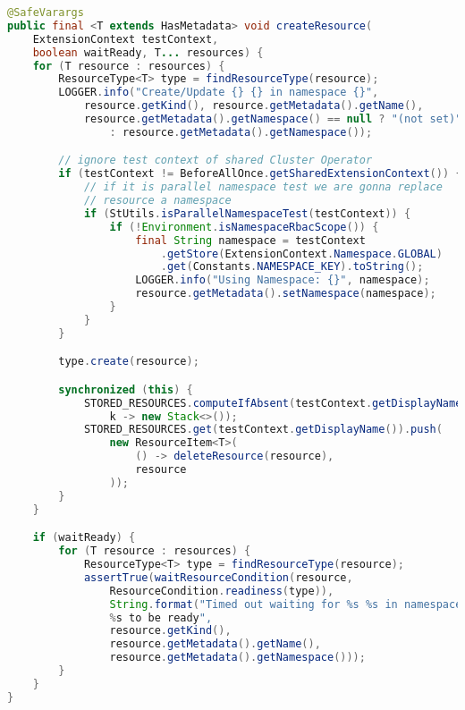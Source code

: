 \begin{lstlisting}[language=Java,label=resourcemanager:complete:create:method,caption=Complete thead-safe method for parallel creation resources,frame=tb]
@SafeVarargs
public final <T extends HasMetadata> void createResource(
    ExtensionContext testContext,
    boolean waitReady, T... resources) {
    for (T resource : resources) {
        ResourceType<T> type = findResourceType(resource);
        LOGGER.info("Create/Update {} {} in namespace {}",
            resource.getKind(), resource.getMetadata().getName(),
            resource.getMetadata().getNamespace() == null ? "(not set)"
                : resource.getMetadata().getNamespace());

        // ignore test context of shared Cluster Operator
        if (testContext != BeforeAllOnce.getSharedExtensionContext()) {
            // if it is parallel namespace test we are gonna replace
            // resource a namespace
            if (StUtils.isParallelNamespaceTest(testContext)) {
                if (!Environment.isNamespaceRbacScope()) {
                    final String namespace = testContext
                        .getStore(ExtensionContext.Namespace.GLOBAL)
                        .get(Constants.NAMESPACE_KEY).toString();
                    LOGGER.info("Using Namespace: {}", namespace);
                    resource.getMetadata().setNamespace(namespace);
                }
            }
        }

        type.create(resource);

        synchronized (this) {
            STORED_RESOURCES.computeIfAbsent(testContext.getDisplayName(),
                k -> new Stack<>());
            STORED_RESOURCES.get(testContext.getDisplayName()).push(
                new ResourceItem<T>(
                    () -> deleteResource(resource),
                    resource
                ));
        }
    }

    if (waitReady) {
        for (T resource : resources) {
            ResourceType<T> type = findResourceType(resource);
            assertTrue(waitResourceCondition(resource,
                ResourceCondition.readiness(type)),
                String.format("Timed out waiting for %s %s in namespace
                %s to be ready",
                resource.getKind(),
                resource.getMetadata().getName(),
                resource.getMetadata().getNamespace()));
        }
    }
}
\end{lstlisting}

